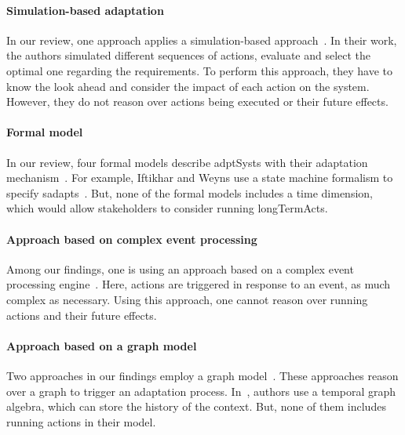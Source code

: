 \paragraph{Simulation-based adaptation}
In our review, one approach applies a simulation-based approach~\cite{DBLP:conf/smartgridsec/0001FKNT14}.
In their work, the authors simulated different sequences of \glspl{action}, evaluate and select the optimal one regarding the requirements.
To perform this approach, they have to know the look ahead and consider the impact of each action on the system.
However, they do not reason over \glspl{action} being executed or their future effects.
	
\paragraph{Formal model}
In our review, four formal models describe \glspl{adptSyst} with their adaptation mechanism~\cite{DBLP:journals/taas/WeynsMA12, DBLP:conf/icse/IftikharW14a, DBLP:journals/taas/WeynsHH10, DBLP:conf/icse/BartelsK11}.
For example, Iftikhar and Weyns use a state machine formalism to specify \glspl{sadapt}~\cite{DBLP:conf/icse/IftikharW14a}.
But, none of the formal models includes a time dimension, which would allow stakeholders to consider running \glspl{longTermAct}.

\paragraph{Approach based on complex event processing}
Among our findings, one is using an approach based on a complex event processing engine~\cite{DBLP:conf/rr/AnicicFRSSS10}.
Here, \glspl{action} are triggered in response to an event, as much complex as necessary.
Using this approach, one cannot reason over running \glspl{action} and their future effects.

\paragraph{Approach based on a graph model}
Two approaches in our findings employ a graph model~\cite{DBLP:journals/tse/KramerM90, DBLP:conf/dbpl/MoffittS17}.
These approaches reason over a graph to trigger an adaptation process.
In~\cite{DBLP:conf/dbpl/MoffittS17}, authors use a temporal graph algebra, which can store the history of the context.
But, none of them includes running \glspl{action} in their model.
	
